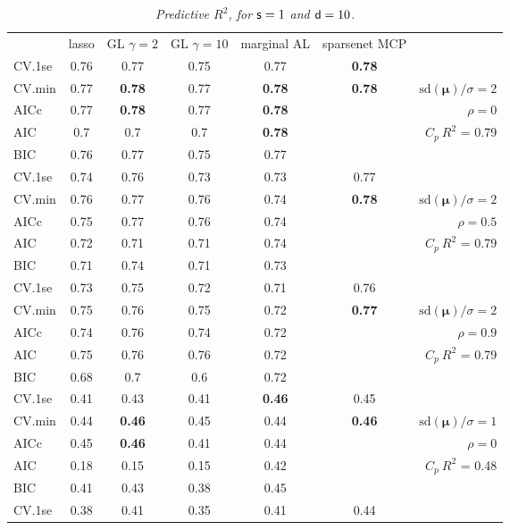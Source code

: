 \documentclass[12pt]{article}
\newcommand{\mr}[1]{\mathrm{#1}}
\newcommand{\bm}[1]{\mathbf{#1}}
\begin{document}
\begin{table}[p]\vspace{-.5cm}
\caption[l]{\label{r2}\it Predictive $R^2$, for ${\sf s}=1$ and  ${\sf d}=10$.}
\vspace{-.5cm}
\small{}
\begin{center}
\begin{tabular}{l*{5}{c}|r}
 & lasso & GL $\gamma=2$ & GL $\gamma=10$ & marginal AL & sparsenet MCP  &  \\
\cline{1-7}
CV.1se & 0.76 & 0.77 & 0.75 & 0.77 & {\bf 0.78} &\\
CV.min & 0.77 & {\bf 0.78} & 0.77 & {\bf 0.78} & {\bf 0.78} &  $\mr{sd}(\bm{\mu})/\sigma=2$ \\
AICc & 0.77 & {\bf 0.78} & 0.77 & {\bf 0.78} & & $\rho=0$ \\
AIC & 0.7 & 0.7 & 0.7 & {\bf 0.78} & & \multirow{2}{*}{$C_p ~ R^2$ = 0.79} \\
BIC & 0.76 & 0.77 & 0.75 & 0.77 & & \\
 \hline 
CV.1se & 0.74 & 0.76 & 0.73 & 0.73 & 0.77 &\\
CV.min & 0.76 & 0.77 & 0.76 & 0.74 & {\bf 0.78} &  $\mr{sd}(\bm{\mu})/\sigma=2$ \\
AICc & 0.75 & 0.77 & 0.76 & 0.74 & & $\rho=0.5$ \\
AIC & 0.72 & 0.71 & 0.71 & 0.74 & & \multirow{2}{*}{$C_p ~ R^2$ = 0.79} \\
BIC & 0.71 & 0.74 & 0.71 & 0.73 & & \\
 \hline 
CV.1se & 0.73 & 0.75 & 0.72 & 0.71 & 0.76 &\\
CV.min & 0.75 & 0.76 & 0.75 & 0.72 & {\bf 0.77} &  $\mr{sd}(\bm{\mu})/\sigma=2$ \\
AICc & 0.74 & 0.76 & 0.74 & 0.72 & & $\rho=0.9$ \\
AIC & 0.75 & 0.76 & 0.76 & 0.72 & & \multirow{2}{*}{$C_p ~ R^2$ = 0.79} \\
BIC & 0.68 & 0.7 & 0.6 & 0.72 & & \\
 \hline 
CV.1se & 0.41 & 0.43 & 0.41 & {\bf 0.46} & 0.45 &\\
CV.min & 0.44 & {\bf 0.46} & 0.45 & 0.44 & {\bf 0.46} &  $\mr{sd}(\bm{\mu})/\sigma=1$ \\
AICc & 0.45 & {\bf 0.46} & 0.41 & 0.44 & & $\rho=0$ \\
AIC & 0.18 & 0.15 & 0.15 & 0.42 & & \multirow{2}{*}{$C_p ~ R^2$ = 0.48} \\
BIC & 0.41 & 0.43 & 0.38 & 0.45 & & \\
 \hline 
CV.1se & 0.38 & 0.41 & 0.35 & 0.41 & 0.44 &\\

\end{tabular}
\end{center}
\end{table}
\end{document}
